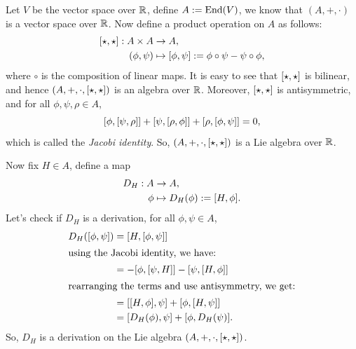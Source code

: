 \begin{example}
	Let \(V\) be the vector space over \(\mathbb R\), define \(A := \operatorname{End}(V)\), we know that \((A, +, \cdot)\) is a vector space over \(\mathbb R\). Now define a product operation on \(A\) as follows:
	\begin{equation}
		\begin{aligned}
			\comm{\star}{\star}: A \times A & \to A,                                                          \\
			(\phi, \psi)                    & \mapsto \comm{\phi}{\psi} := \phi \circ \psi - \psi \circ \phi,
		\end{aligned}
	\end{equation}
	where \(\circ\) is the composition of linear maps. It is easy to see that \(\comm{\star}{\star}\) is bilinear, and hence \((A, +, \cdot, \comm{\star}{\star})\) is an algebra over \(\mathbb R\).
	Moreover, \(\comm{\star}{\star}\) is antisymmetric, and for all \(\phi, \psi, \rho \in A\),
	\begin{equation}
		\comm{\phi}{\comm{\psi}{\rho}} + \comm{\psi}{\comm{\rho}{\phi}} + \comm{\rho}{\comm{\phi}{\psi}} = 0,
	\end{equation}
	which is called the \emph{Jacobi identity}. So, \((A, +, \cdot, \comm{\star}{\star})\) is a Lie algebra over \(\mathbb R\).

	Now fix \(H \in A\), define a map
	\begin{equation}
		\begin{aligned}
			D_H : A & \to A,                               \\
			\phi    & \mapsto D_H(\phi) := \comm{H}{\phi}.
		\end{aligned}
	\end{equation}
	Let's check if \(D_H\) is a derivation, for all \(\phi, \psi \in A\),
	\begin{align*}
		D_H(\comm{\phi}{\psi}) & = \comm{H}{\comm{\phi}{\psi}}                                \\
		\shortintertext{using the Jacobi identity, we have:}
		                       & = -\comm{\phi}{\comm{\psi}{H}} - \comm{\psi}{\comm{H}{\phi}} \\
		\shortintertext{rearranging the terms and use antisymmetry, we get:}
		                       & = \comm{\comm{H}{\phi}}{\psi} + \comm{\phi}{\comm{H}{\psi}}  \\
		                       & = \comm{D_H(\phi)}{\psi} + \comm{\phi}{D_H(\psi)}.
	\end{align*}
	So, \(D_H\) is a derivation on the Lie algebra \((A, +, \cdot, \comm{\star}{\star})\).
\end{example}
